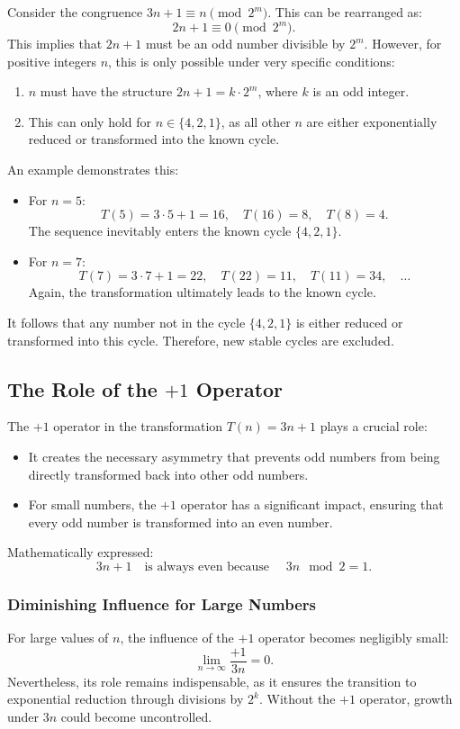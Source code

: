 \documentclass[a4paper,12pt]{article}
\begin{document}
Consider the congruence \( 3n + 1 \equiv n \pmod{2^m} \). This can be rearranged as:
\[
2n + 1 \equiv 0 \pmod{2^m}.
\]
This implies that \( 2n + 1 \) must be an odd number divisible by \( 2^m \). However, for positive integers \( n \), this is only possible under very specific conditions:
\begin{enumerate}
    \item \( n \) must have the structure \( 2n + 1 = k \cdot 2^m \), where \( k \) is an odd integer.
    \item This can only hold for \( n \in \{4, 2, 1\} \), as all other \( n \) are either exponentially reduced or transformed into the known cycle.
\end{enumerate}

An example demonstrates this:
\begin{itemize}
    \item For \( n = 5 \): 
    \[
    T(5) = 3 \cdot 5 + 1 = 16, \quad T(16) = 8, \quad T(8) = 4.
    \]
    The sequence inevitably enters the known cycle \( \{4, 2, 1\} \).
    \item For \( n = 7 \): 
    \[
    T(7) = 3 \cdot 7 + 1 = 22, \quad T(22) = 11, \quad T(11) = 34, \quad \dots
    \]
    Again, the transformation ultimately leads to the known cycle.
\end{itemize}

It follows that any number not in the cycle \( \{4, 2, 1\} \) is either reduced or transformed into this cycle. Therefore, new stable cycles are excluded.

\subsection{The Role of the \(+1\) Operator}
The \(+1\) operator in the transformation \( T(n) = 3n + 1 \) plays a crucial role:
\begin{itemize}
    \item It creates the necessary asymmetry that prevents odd numbers from being directly transformed back into other odd numbers.
    \item For small numbers, the \(+1\) operator has a significant impact, ensuring that every odd number is transformed into an even number.
\end{itemize}

Mathematically expressed:
\[
3n + 1 \quad \text{is always even because } \quad 3n \mod 2 = 1.
\]

\subsubsection{Diminishing Influence for Large Numbers}
For large values of \( n \), the influence of the \(+1\) operator becomes negligibly small:
\[
\lim_{n \to \infty} \frac{+1}{3n} = 0.
\]
Nevertheless, its role remains indispensable, as it ensures the transition to exponential reduction through divisions by \( 2^k \). Without the \(+1\) operator, growth under \( 3n \) could become uncontrolled.
\end{document}
